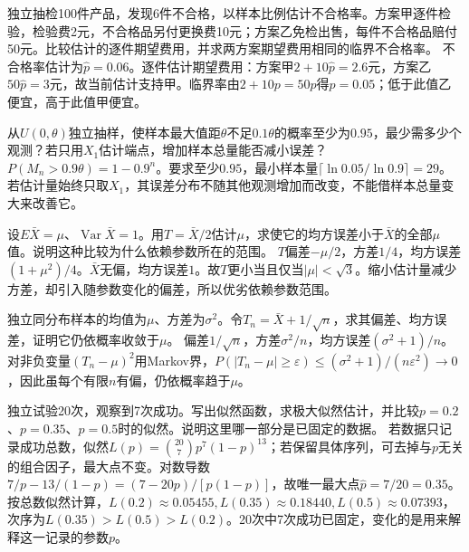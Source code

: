 独立抽检100件产品，发现6件不合格，以样本比例估计不合格率。方案甲逐件检验，检验费2元，不合格品另付更换费10元；方案乙免检出售，每件不合格品赔付50元。比较估计的逐件期望费用，并求两方案期望费用相同的临界不合格率。
\solutionanswer
不合格率估计为\(\widehat p=0.06\)。逐件估计期望费用：方案甲\(2+10\widehat p=2.6\)元，方案乙\(50\widehat p=3\)元，故当前估计支持甲。临界率由\(2+10p=50p\)得\(p=0.05\)；低于此值乙便宜，高于此值甲便宜。


从\(U(0,\theta)\)独立抽样，使样本最大值距\(\theta\)不足\(0.1\theta\)的概率至少为\(0.95\)，最少需多少个观测？若只用\(X_1\)估计端点，增加样本总量能否减小误差？
\solutionanswer
\(P(M_n>0.9\theta)=1-0.9^n\)。要求至少\(0.95\)，最小样本量\(\lceil\ln0.05/\ln0.9\rceil=29\)。若估计量始终只取\(X_1\)，其误差分布不随其他观测增加而改变，不能借样本总量变大来改善它。


设\(E\bar X=\mu\)、\(\operatorname{Var}\bar X=1\)。用\(T=\bar X/2\)估计\(\mu\)，求使它的均方误差小于\(\bar X\)的全部\(\mu\)值。说明这种比较为什么依赖参数所在的范围。
\solutionanswer
\(T\)偏差\(-\mu/2\)，方差\(1/4\)，均方误差\((1+\mu^2)/4\)。\(\bar X\)无偏，均方误差\(1\)。故\(T\)更小当且仅当\(|\mu|<\sqrt3\)。缩小估计量减少方差，却引入随参数变化的偏差，所以优劣依赖参数范围。


独立同分布样本的均值为\(\mu\)、方差为\(\sigma^2\)。令\(T_n=\bar X+1/\sqrt n\)，求其偏差、均方误差，证明它仍依概率收敛于\(\mu\)。
\solutionanswer
偏差\(1/\sqrt n\)，方差\(\sigma^2/n\)，均方误差\((\sigma^2+1)/n\)。对非负变量\((T_n-\mu)^2\)用Markov界，\(P(|T_n-\mu|\ge\varepsilon)\le(\sigma^2+1)/(n\varepsilon^2)\to0\)，因此虽每个有限\(n\)有偏，仍依概率趋于\(\mu\)。


独立试验20次，观察到7次成功。写出似然函数，求极大似然估计，并比较\(p=0.2\)、\(p=0.35\)、\(p=0.5\)时的似然。说明这里哪一部分是已固定的数据。
\solutionanswer
若数据只记录成功总数，似然\(L(p)=\binom{20}7p^7(1-p)^{13}\)；若保留具体序列，可去掉与\(p\)无关的组合因子，最大点不变。对数导数\(7/p-13/(1-p)=(7-20p)/[p(1-p)]\)，故唯一最大点\(\widehat p=7/20=0.35\)。按总数似然计算，\(L(0.2)\approx0.05455,L(0.35)\approx0.18440,L(0.5)\approx0.07393\)，次序为\(L(0.35)>L(0.5)>L(0.2)\)。20次中7次成功已固定，变化的是用来解释这一记录的参数\(p\)。


